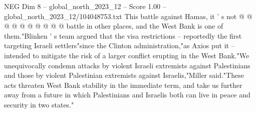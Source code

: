 \begin{textsample}{NEG Dim 8 – global\_north\_2023\_12 – Score 1.00 – global\_north\_2023\_12/104048753.txt}
This battle against Hamas, it ' s not @ @ @ @ @ @ @ @ @ @ battle in other places, and the West Bank is one of them."Blinken ' s team argued that the visa restrictions -- reportedly the first targeting Israeli settlers"since the Clinton administration,"as Axios put it -- intended to mitigate the risk of a larger conflict erupting in the West Bank."We unequivocally condemn attacks by violent Israeli extremists against Palestinians and those by violent Palestinian extremists against Israelis,"Miller said."These acts threaten West Bank stability in the immediate term, and take us further away from a future in which Palestinians and Israelis both can live in peace and security in two states."

\end{textsample}
